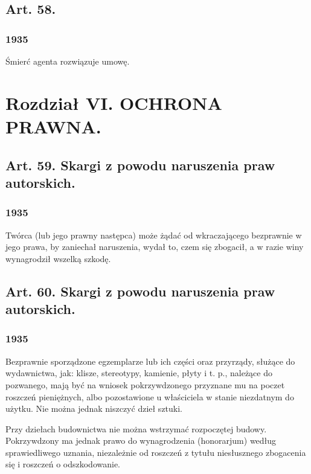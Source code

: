 \documentclass[withmarginpar]{book}
\begin{document}
\section{Art. 58.}
\label{sec:art.-58}
\subsection{1935}
\label{sec:art.-58-1}

Śmierć agenta rozwiązuje umowę.

\chapter{Rozdział   VI.
OCHRONA PRAWNA.}
\label{cha:r-o-z-4}

\section{Art. 59. Skargi z powodu naruszenia praw autorskich.}
\label{sec:art.-59}
\subsection{1935}
\label{sec:art.-59-1}

Twórca (lub jego prawny następca) może żądać od wkraczającego
bezprawnie w jego prawa, by zaniechał naruszenia, wydał to, czem się
zbogacił, a w razie winy wynagrodził wszelką szkodę.

\section{Art. 60. Skargi z powodu naruszenia praw autorskich.}
\label{sec:art.-60}
\subsection{1935}
\label{sec:art.-60-1}

Bezprawnie sporządzone egzemplarze lub ich części oraz przyrządy,
służące do wydawnictwa, jak: klisze, stereotypy, kamienie, płyty i
t. p., należące do pozwanego, mają być na wniosek pokrzywdzonego
przyznane mu na poczet roszczeń pieniężnych, albo pozostawione u
właściciela w stanie niezdatnym do użytku. Nie można jednak niszczyć
dzieł sztuki.

Przy dziełach budownictwa nie można wstrzymać rozpoczętej
budowy. Pokrzywdzony ma jednak prawo do wynagrodzenia (honorarjum)
według sprawiedliwego uznania, niezależnie od roszczeń z tytułu
niesłusznego zbogacenia się i roszczeń o odszkodowanie.
\end{document}
